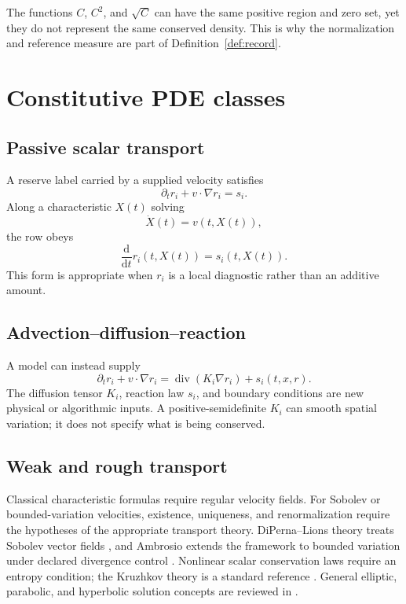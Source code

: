 \documentclass[11pt]{article}
\theoremstyle{definition}
\theoremstyle{remark}
\newcommand{\dd}{\mathrm d}
\newcommand{\Div}{\operatorname{div}}
\begin{document}
The functions \(C\), \(C^2\), and \(\sqrt C\) can have the same positive
region and zero set, yet they do not represent the same conserved density.
This is why the normalization and reference measure are part of
Definition~\ref{def:record}.

\section{Constitutive PDE classes}
\label{sec:pde}

\subsection{Passive scalar transport}

A reserve label carried by a supplied velocity satisfies
\[
 \partial_t r_i+v\cdot\nabla r_i=s_i.
\]
Along a characteristic \(X(t)\) solving
\[
 \dot X(t)=v(t,X(t)),
\]
the row obeys
\[
 \frac{\dd}{\dd t}r_i(t,X(t))
=s_i(t,X(t)).
\]
This form is appropriate when \(r_i\) is a local diagnostic rather than an
additive amount.

\subsection{Advection--diffusion--reaction}

A model can instead supply
\[
 \partial_t r_i+v\cdot\nabla r_i
=
\Div(K_i\nabla r_i)+s_i(t,x,r).
\]
The diffusion tensor \(K_i\), reaction law \(s_i\), and boundary conditions
are new physical or algorithmic inputs.  A positive-semidefinite \(K_i\)
can smooth spatial variation; it does not specify what is being conserved.

\subsection{Weak and rough transport}

Classical characteristic formulas require regular velocity fields.  For
Sobolev or bounded-variation velocities, existence, uniqueness, and
renormalization require the hypotheses of the appropriate transport
theory.  DiPerna--Lions theory treats Sobolev vector fields
\cite{DiPernaLions1989}, and Ambrosio extends the framework to bounded
variation under declared divergence control \cite{Ambrosio2004}.
Nonlinear scalar conservation laws require an entropy condition; the
Kruzhkov theory is a standard reference \cite{Kruzhkov1970}.  General
elliptic, parabolic, and hyperbolic solution concepts are reviewed in
\cite{Evans2010}.
\end{document}
